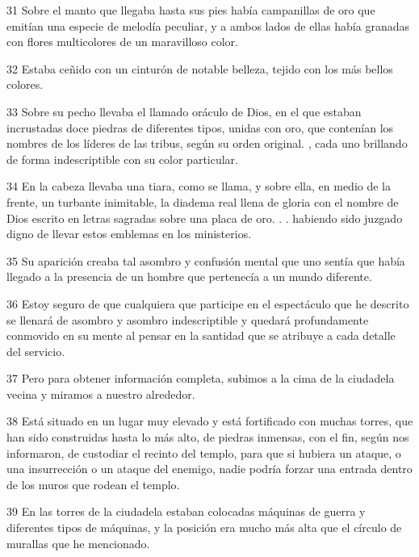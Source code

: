 \par 31 Sobre el manto que llegaba hasta sus pies había campanillas de oro que emitían una especie de melodía peculiar, y a ambos lados de ellas había granadas con flores multicolores de un maravilloso color.

\par 32 Estaba ceñido con un cinturón de notable belleza, tejido con los más bellos colores.

\par 33 Sobre su pecho llevaba el llamado oráculo de Dios, en el que estaban incrustadas doce piedras de diferentes tipos, unidas con oro, que contenían los nombres de los líderes de las tribus, según su orden original. , cada uno brillando de forma indescriptible con su color particular.

\par 34 En la cabeza llevaba una tiara, como se llama, y ​​sobre ella, en medio de la frente, un turbante inimitable, la diadema real llena de gloria con el nombre de Dios escrito en letras sagradas sobre una placa de oro. . . habiendo sido juzgado digno de llevar estos emblemas en los ministerios.

\par 35 Su aparición creaba tal asombro y confusión mental que uno sentía que había llegado a la presencia de un hombre que pertenecía a un mundo diferente.

\par 36 Estoy seguro de que cualquiera que participe en el espectáculo que he descrito se llenará de asombro y asombro indescriptible y quedará profundamente conmovido en su mente al pensar en la santidad que se atribuye a cada detalle del servicio.

\par 37 Pero para obtener información completa, subimos a la cima de la ciudadela vecina y miramos a nuestro alrededor.

\par 38 Está situado en un lugar muy elevado y está fortificado con muchas torres, que han sido construidas hasta lo más alto, de piedras inmensas, con el fin, según nos informaron, de custodiar el recinto del templo, para que si hubiera un ataque, o una insurrección o un ataque del enemigo, nadie podría forzar una entrada dentro de los muros que rodean el templo.

\par 39 En las torres de la ciudadela estaban colocadas máquinas de guerra y diferentes tipos de máquinas, y la posición era mucho más alta que el círculo de murallas que he mencionado.

